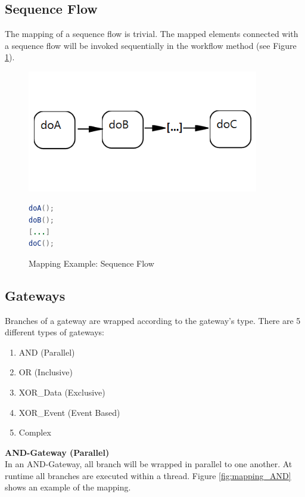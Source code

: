 \subsection{Sequence Flow}
The mapping of a sequence flow is trivial. The mapped elements connected with a sequence flow will be invoked sequentially in the workflow method (see Figure \ref{fig:mapping_sequence}).

\begin{figure}[h]
\begin{minipage}[c]{0.5\textwidth}
\includegraphics[width=0.9\textwidth]{images/mapping/sequence.png}
\end{minipage}
\begin{minipage}[c]{0.5\textwidth}
\begin{lstlisting}[language=Java]
doA();
doB();
[...]
doC();
\end{lstlisting}
\end{minipage}
\caption{Mapping Example: Sequence Flow}%
\label{fig:mapping_sequence}%
\end{figure}

\subsection{Gateways}
Branches of a gateway are wrapped according to the gateway's type. There are 5 different types of gateways:
\begin{enumerate}
	\item AND (Parallel)
	\item OR (Inclusive)
	\item XOR\_Data (Exclusive)
	\item XOR\_Event (Event Based)
	\item Complex 
\end{enumerate}

\textbf{AND-Gateway (Parallel)}\\
In an AND-Gateway, all branch will be wrapped in parallel to one another. At runtime all branches are executed within a thread. 
Figure \ref{fig:mapping_AND} shows an example of the mapping. \\

